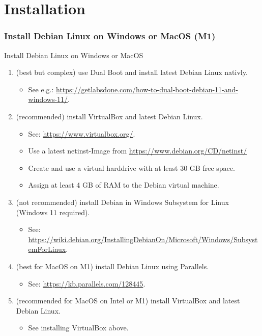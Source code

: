 \part[withpartpage]{Installation}
\nosectionpage
\section{Install Debian Linux on Windows or MacOS (M1)}
\withsectionpage

\begin{frame}{Install Debian Linux on Windows or MacOS}
  \begin{enumerate}
    \item[Either] (best but complex) use \alert{Dual Boot} and install \alert{latest Debian} Linux \alert{nativly}.
    \begin{itemize}
      \item See e.g.: \alert{\href{https://getlabsdone.com/how-to-dual-boot-debian-11-and-windows-11/}{https://getlabsdone.com/how-to-dual-boot-debian-11-and-windows-11/}}.
    \end{itemize}
    \item[Or] (recommended) install \alert{VirtualBox} and \alert{latest Debian} Linux.
    \begin{itemize}
      \item See: \alert{\href{https://www.virtualbox.org/}{https://www.virtualbox.org/}}.
      \item Use a latest \alert{netinst-Image} from \alert{\href{https://www.debian.org/CD/netinst/}{https://www.debian.org/CD/netinst/}}
      \item Create and use a virtual harddrive with at least \alert{30 GB} free space.
      \item Assign at least \alert{4 GB} of \alert{RAM} to the \alert{Debian virtual machine}.
    \end{itemize}
    \item[Or] (not recommended) install Debian in Windows Subsystem for Linux (Windows 11 required).
    \begin{itemize}
      \item See: \alert{\href{https://wiki.debian.org/InstallingDebianOn/Microsoft/Windows/SubsystemForLinux}{https://wiki.debian.org/InstallingDebianOn/Microsoft/Windows/SubsystemForLinux}}.
    \end{itemize}
    \item[Or] (best for \alert{MacOS} on M1) install Debian Linux using \alert{Parallels}.
    \begin{itemize}
      \item See: \alert{\href{https://kb.parallels.com/128445}{https://kb.parallels.com/128445}}.
    \end{itemize}
    \item[Or] (recommended for \alert{MacOS} on Intel or M1) install \alert{VirtualBox} and latest Debian Linux.
    \begin{itemize}
      \item See installing \alert{VirtualBox} above.
    \end{itemize}
  \end{enumerate}
\end{frame}
